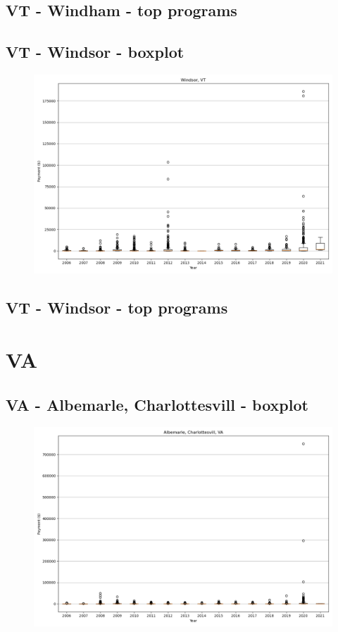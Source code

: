 \subsection*{VT - Windham - top programs}

\newpage
\subsection*{VT - Windsor - boxplot}
\begin{figure}[h]
\centering
\includegraphics[width=7in]{../output/boxplots/counties/Windsor-VT_boxplot.png}
\end{figure}


\subsection*{VT - Windsor - top programs}

\newpage
\section*{VA}
\subsection*{VA - Albemarle, Charlottesvill - boxplot}
\begin{figure}[h]
\centering
\includegraphics[width=7in]{../output/boxplots/counties/Albemarle, Charlottesvill-VA_boxplot.png}
\end{figure}


